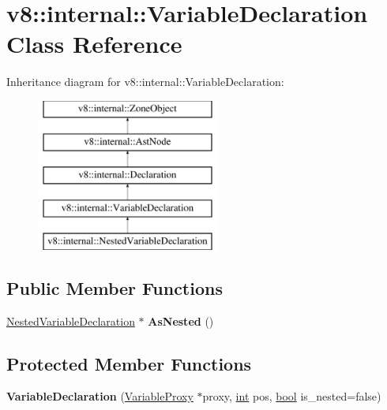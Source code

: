 \hypertarget{classv8_1_1internal_1_1VariableDeclaration}{}\section{v8\+:\+:internal\+:\+:Variable\+Declaration Class Reference}
\label{classv8_1_1internal_1_1VariableDeclaration}
Inheritance diagram for v8\+:\+:internal\+:\+:Variable\+Declaration\+:\begin{figure}[H]
\begin{center}
\leavevmode
\includegraphics[height=5.000000cm]{classv8_1_1internal_1_1VariableDeclaration}
\end{center}
\end{figure}
\subsection*{Public Member Functions}
\begin{DoxyCompactItemize}
\item 
\mbox{\label{classv8_1_1internal_1_1VariableDeclaration_a8cf52c0a6c766bd77da0fdf4ccc8dea0}} 
\mbox{\hyperlink{classv8_1_1internal_1_1NestedVariableDeclaration}{Nested\+Variable\+Declaration}} $\ast$ {\bfseries As\+Nested} ()
\end{DoxyCompactItemize}
\subsection*{Protected Member Functions}
\begin{DoxyCompactItemize}
\item 
\mbox{\label{classv8_1_1internal_1_1VariableDeclaration_a61c4d773e1d49c39a73949cd951a50ae}} 
{\bfseries Variable\+Declaration} (\mbox{\hyperlink{classv8_1_1internal_1_1VariableProxy}{Variable\+Proxy}} $\ast$proxy, \mbox{\hyperlink{classint}{int}} pos, \mbox{\hyperlink{classbool}{bool}} is\+\_\+nested=false)
\end{DoxyCompactItemize}

